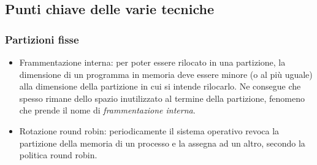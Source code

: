 \documentclass[12pt,a4paper]{article}
\begin{document}
\subsection{Punti chiave delle varie tecniche}

\subsubsection{Partizioni fisse}
\begin{itemize}
  \item Frammentazione interna: per poter essere rilocato in una
    partizione, la dimensione di un programma in memoria deve essere
    minore (o al più uguale) alla dimensione della partizione in cui
    si intende rilocarlo. Ne consegue che spesso rimane dello spazio
    inutilizzato al termine della partizione, fenomeno che prende il
    nome di \emph{frammentazione interna}.
  \item Rotazione round robin: periodicamente il sistema operativo
    revoca la partizione della memoria di un processo e la assegna
    ad un altro, secondo la politica round robin.
\end{itemize}
\end{document}
